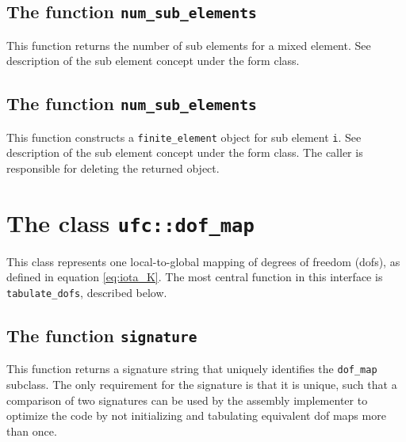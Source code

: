 \subsection{The function \texttt{num\_sub\_elements}}
This function returns the number of sub elements for a mixed element.
See description of the sub element concept under the form class.


\subsection{The function \texttt{num\_sub\_elements}}
This function constructs a \texttt{finite\_element} object for sub element \texttt{i}.
See description of the sub element concept under the form class.
The caller is responsible for deleting the returned object.




\section{The class \texttt{ufc::dof\_map}}

This class represents one local-to-global mapping of degrees of freedom (dofs),
as defined in equation \eqref{eq:iota_K}.
The most central function in this interface is \texttt{tabulate\_dofs}, described below.






\subsection{The function \texttt{signature}}
This function returns a signature string that uniquely identifies the \texttt{dof\_map} subclass.
The only requirement for the signature is that it is unique, such
that a comparison of two signatures can be used by the assembly
implementer to optimize the code by not initializing and tabulating equivalent dof maps more than once.

